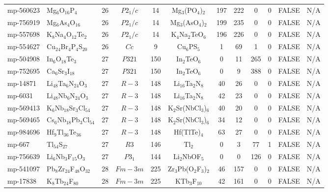 {\begin{longtable}{llcccccccccc}
    mp-560623 & Mg$_{6}$O$_{16}$P$_{4}$ & 26    & $P2_1/c$ & 14    & Mg$_{3}$(PO$_{4}$)$_{2}$ & 197   & 222   & 0     & 0     & FALSE & N/A \\
    mp-756919 & Mg$_{6}$As$_{4}$O$_{16}$ & 26    & $P2_1/c$ & 14    & Mg$_{3}$(AsO$_{4}$)$_{2}$ & 199   & 235   & 0     & 0     & FALSE & N/A \\
    mp-557698 & K$_{8}$Na$_{4}$O$_{12}$Te$_{2}$ & 26    & $P2_1/c$ & 14    & K$_{4}$Na$_{2}$TeO$_{6}$ & 196   & 226   & 0     & 0     & FALSE & N/A \\
    mp-554627 & Cu$_{24}$Br$_{4}$P$_{4}$S$_{20}$ & 26    & $Cc$  & 9     & Cu$_{6}$PS$_{5}$ & 1     & 69    & 1     & 0     & FALSE & N/A \\
    mp-504908 & In$_{6}$O$_{18}$Te$_{3}$ & 27    & $P321$ & 150   & In$_{2}$TeO$_{6}$ & 0     & 11    & 265   & 0     & FALSE & N/A \\
    mp-752695 & Ca$_{6}$Sr$_{3}$I$_{18}$ & 27    & $P321$ & 150   & In$_{2}$TeO$_{6}$ & 0     & 9     & 388   & 0     & FALSE & N/A \\
    mp-14871 & Li$_{48}$Ta$_{6}$N$_{24}$O$_{3}$ & 27    & $R-3$ & 148   & Li$_{16}$Ta$_{2}$N$_{8}$ & 40    & 26    & 0     & 0     & FALSE & N/A \\
    mp-6031 & Li$_{48}$Nb$_{6}$N$_{24}$O$_{3}$ & 27    & $R-3$ & 148   & Li$_{16}$Ta$_{2}$N$_{8}$ & 42    & 23    & 0     & 0     & FALSE & N/A \\
    mp-569413 & K$_{6}$Nb$_{18}$Sr$_{3}$Cl$_{54}$ & 27    & $R-3$ & 148   & K$_{2}$Sr(NbCl$_{3}$)$_{6}$ & 40    & 20    & 0     & 0     & FALSE & N/A \\
    mp-569465 & Cs$_{6}$Nb$_{18}$Pb$_{3}$Cl$_{54}$ & 27    & $R-3$ & 148   & K$_{2}$Sr(NbCl$_{3}$)$_{6}$ & 34    & 12    & 0     & 0     & FALSE & N/A \\
    mp-984696 & Hf$_{9}$Tl$_{36}$Te$_{36}$ & 27    & $R-3$ & 148   & Hf(TlTe)$_{4}$ & 63    & 27    & 0     & 0     & FALSE & N/A \\
    mp-667 & Tl$_{54}$S$_{27}$ & 27    & $R3$  & 146   & Tl$_{2}$ & 0     & 3     & 77    & 1     & FALSE & N/A \\
    mp-756639 & Li$_{6}$Nb$_{3}$F$_{15}$O$_{3}$ & 27    & $P3_1$ & 144   & Li$_{2}$NbOF$_{5}$ & 0     & 0     & 126   & 0     & FALSE & N/A \\
    mp-541097 & Pb$_{8}$Zr$_{24}$F$_{48}$O$_{32}$ & 28    & $Fm-3m$ & 225   & Zr$_{3}$Pb(O$_{2}$F$_{3}$)$_{2}$ & 46    & 157   & 0     & 0     & FALSE & N/A \\
    mp-17838 & K$_{8}$Tb$_{24}$F$_{80}$ & 28    & $Fm-3m$ & 225   & KTb$_{3}$F$_{10}$ & 42    & 161   & 0     & 0     & FALSE & N/A \\

\end{longtable}}
